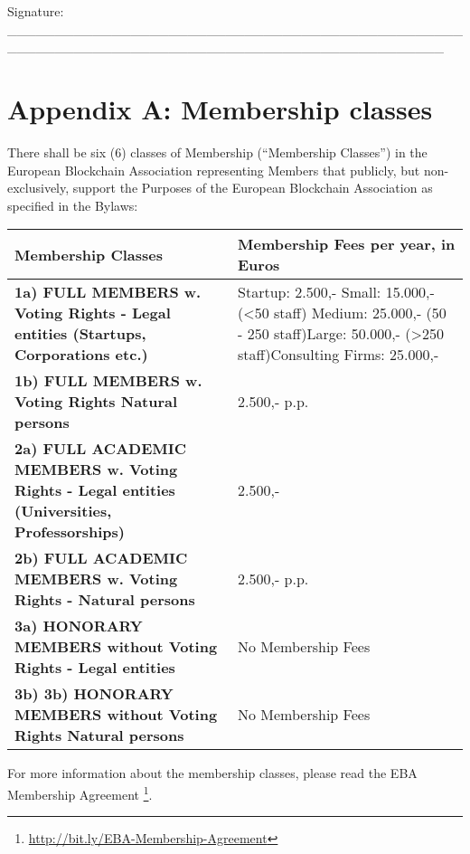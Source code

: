 \documentclass{article}
\begin{document}
\vspace{2cm}

Signature: \_\_\_\_\_\_\_\_\_\_\_\_\_\_\_\_\_\_\_\_\_\_\_\_\_\_\_\_\_\_\_\_\_\_\_\_\_\_\_\_\_\_\_\_\_\_\_\_\_\_\_\_\_\_\_\_\_\_\_\_\_\_\_\_\_\_\_\_\_\_\_\_\_\_\_\_\_\_\_\_\_\_\_\_\_\_\_\_\_\_\_\_\_\_\	

\newpage

\section*{Appendix A: Membership classes}

There shall be six (6) classes of Membership (“Membership Classes”) in the European Blockchain Association representing Members that publicly, but non-exclusively, support the Purposes of the European Blockchain Association as specified in the Bylaws:
	
\begin{longtable}{| p{} | p{} |}
	\hline
 	   \textbf{Membership Classes} & \textbf{Membership Fees per year, in Euros} \\ \hline\hline
 	   \textbf{1a) FULL MEMBERS w. Voting Rights - Legal entities (Startups, Corporations etc.)} &
	Startup: 2.500,- \newline Small: 15.000,- (\textless 50 staff) \newline Medium: 25.000,- (50 - 250 			staff)\newline Large: 50.000,- (\textgreater 250 staff)\newline Consulting Firms: 25.000,- \\
	\hline
		\textbf{1b) FULL MEMBERS w. Voting Rights Natural persons} & 2.500,- p.p. \\                                                                                                             	\hline
		\textbf{2a) FULL ACADEMIC MEMBERS w. Voting Rights - Legal entities (Universities, Professorships)} & 2.500,- \\                                                                                                             	\hline
		\textbf{2b) FULL ACADEMIC MEMBERS w. Voting Rights - Natural persons} & 2.500,-  p.p. \\                                                                                                             	\hline
		\textbf{3a) HONORARY MEMBERS without Voting Rights - Legal entities} & No Membership Fees \\                                                                                                             	\hline
		\textbf{3b) 3b) HONORARY MEMBERS without Voting Rights Natural persons} & No Membership Fees \\                                                                                                            
	\hline
\end{longtable}

For more information about the membership classes, please read the EBA Membership Agreement \footnote{\url{http://bit.ly/EBA-Membership-Agreement}}.
\end{document}

